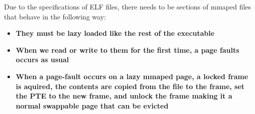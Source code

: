 \documentclass{report}
\newcommand{\bullpara}[2]{\item \textbf{#1} \ #2}
\newcommand{\compitem}[1]{\begin{itemize}\setlength\itemsep{-0.1em}#1\end{itemize}}
\begin{document}
				Due to the specifications of ELF files, there needs to be sections of mmaped files that behave in the
				following way:
				\compitem{
					\bullpara{They must be lazy loaded like the rest of the executable}{}
					\bullpara{When we read or write to them for the first time, a page faults occurs as usual}{}
					\bullpara{When a page-fault occurs on a lazy mmaped page, a locked frame is aquired, the contents are copied
					from the file to the frame, set the PTE to the new frame, and unlock the frame making it a normal swappable
					page that can be evicted}{}
				}

				
\end{document}
